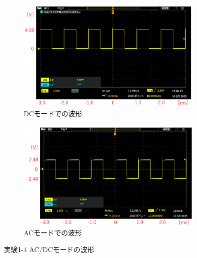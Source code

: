 \documentclass[uplatex, a4j, dvipdfmx]{jsarticle}
\begin{document}
\begin{figure}[htbp]
    \centering
    \begin{subfigure}[b]{0.48\textwidth}
        \centering
        \includegraphics[width=\linewidth]{picture/O7.png}
        \caption{DCモードでの波形}
        \label{O7}
    \end{subfigure}
    \hfill
    \begin{subfigure}[b]{0.48\textwidth}
        \centering
        \includegraphics[width=\linewidth]{picture/O8.png}
        \caption{ACモードでの波形}
        \label{O8}
    \end{subfigure}
    \caption{実験1-4 AC/DCモードの波形}
    \label{O7-8}
\end{figure}

\clearpage
\end{document}
